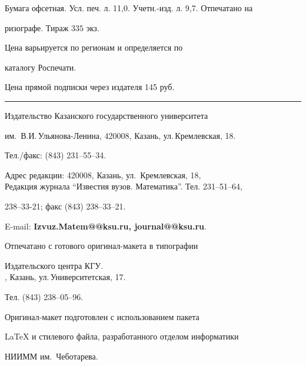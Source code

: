 Бумага офсетная. Усл. печ. л. 11,0. Учетн.-изд. л. 9,7. Отпечатано на 


ризографе. Тираж $335$ экз. 





\noindent Цена варьируется по регионам и определяется по 


каталогу Роспечати. 





\noindent Цена прямой подписки через издателя 145 руб. 


\bigskip


\hrule


\bigskip


\noindent Издательство Казанского государственного университета


им.~В.И.\,Ульянова-Ленина, 420008, Казань, ул.\,Кремлевская, 18.


Тел./факс: (843) 231--55--34.\\


\smallskip





\noindent Адрес редакции: 420008, Казань, ул.~Кремлевская, 18,\\  


Редакция журнала  ``Известия вузов. Математика''. Тел. 231--51--64,


238--33-21; факс (843) 238--33--21.





\noindent E-mail: {\bf Izvuz.Matem@@ksu.ru, journal@@ksu.ru}. \par


\bigskip 


\noindent Отпечатано с готового оригинал-макета в типографии


Издательского центра КГУ. \\





, Казань, ул.\,Университетская, 17.


Тел. (843) 238--05--96. \par


\bigskip


\noindent Оригинал-макет подготовлен с использованием пакета


\AmS\LaTeX{} и стилевого файла, разработанного отделом информатики


НИИММ им.~Чеботарева.








